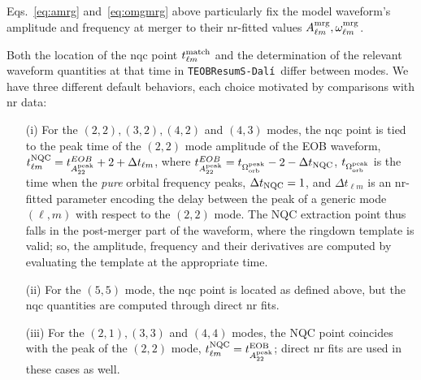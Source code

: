 \documentclass[prd,amssymb,amsmath,amsfonts,nofootinbib,reprint,showpacs,longbibliography]{revtex4-1}
\def\TEOBResumSDali{\texttt{TEOBResumS-Dalí}}
\newcommand{\amrg}[1]{{A_{#1}^{\rm mrg}}}
\newcommand{\omgmrg}[1]{{\omega_{#1}^{\rm mrg}}}
\begin{document}
Eqs.~\eqref{eq:amrg} and~\eqref{eq:omgmrg} above particularly fix the model waveform's amplitude and
frequency at merger to their \ac{nr}-fitted values $\amrg{\ell m}, \omgmrg{\ell m}$.

Both the location of the \ac{nqc} point $t_{\ell m}^{\rm match}$ and the determination
of the relevant waveform quantities at that time in \TEOBResumSDali~differ between modes.
We have three different default behaviors, each choice motivated by comparisons with
\ac{nr} data:
\begin{itemize}
\item[(i)] For the $(2,2), (3,2), (4,2)$ and $(4,3)$ modes, the \ac{nqc} point is tied to the peak time of the $(2,2)$
mode amplitude of the EOB waveform, $t_{\ell m}^{\rm NQC} = t_{A_{22}^{\rm peak}}^{EOB} + 2 + \Delta t_{\ell m}$, 
where $t_{A_{22}^{\rm peak}}^{EOB} = t_{\Omega_{\rm orb}^{\rm peak}} - 2 - \Delta t_{\rm NQC}$, $t_{\Omega_{\rm orb}^{\rm peak}}$
is the time when the \textit{pure} orbital frequency peaks, $\Delta t_{\rm NQC} = 1$, and $\Delta t_{\ell m}$ is an \ac{nr}-fitted parameter
encoding the delay between the peak of a generic mode $(\ell, m)$ with respect to the $(2,2)$ mode.
The NQC extraction point thus falls in the post-merger part of the waveform, where the ringdown
template is valid; so, the amplitude, frequency and their derivatives are computed by evaluating the
template at the appropriate time.
\item[(ii)] For the $(5,5)$ mode, the \ac{nqc} point is located as defined above, but the \ac{nqc} quantities
are computed through direct \ac{nr} fits.
\item[(iii)] For the $(2,1), (3,3)$ and $(4,4)$ modes, the NQC point coincides
with the peak of the $(2,2)$ mode, $t_{\ell m}^{\rm NQC} = t_{A_{22}^{\rm peak}}^{\rm EOB}$; direct \ac{nr} fits 
are used in these cases as well.
\end{itemize}
\end{document}
